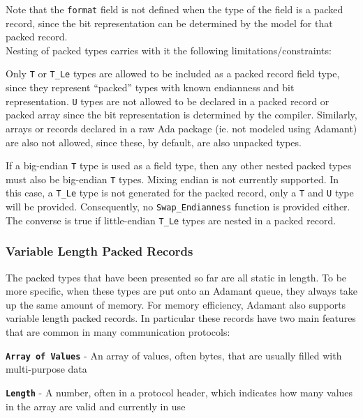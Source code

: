 
Note that the \texttt{format} field is not defined when the type of the field is a packed record, since the bit representation can be determined by the model for that packed record. \\

Nesting of packed types carries with it the following limitations/constraints:

\vspace{5mm} %
\begin{spacedenumerate}
  \item Only \texttt{T} or \texttt{T\_Le} types are allowed to be included as a packed record field type, since they represent ``packed'' types with known endianness and bit representation. \texttt{U} types are not allowed to be declared in a packed record or packed array since the bit representation is determined by the compiler. Similarly, arrays or records declared in a raw Ada package (ie. not modeled using Adamant) are also not allowed, since these, by default, are also unpacked types.
  \item If a big-endian \texttt{T} type is used as a field type, then any other nested packed types must also be big-endian \texttt{T} types. Mixing endian is not currently supported. In this case, a \texttt{T\_Le} type is not generated for the packed record, only a \texttt{T} and \texttt{U} type will be provided. Consequently, no \texttt{Swap\_Endianness} function is provided either. The converse is true if little-endian \texttt{T\_Le} types are nested in a packed record.
\end{spacedenumerate}
\vspace{5mm} %

\subsubsection{Variable Length Packed Records} \label{Variable Length Packed Records}

The packed types that have been presented so far are all static in length. To be more specific, when these types are put onto an Adamant queue, they always take up the same amount of memory. For memory efficiency, Adamant also supports variable length packed records. In particular these records have two main features that are common in many communication protocols:

\vspace{5mm} %
\begin{spaceditemize}
  \item \textbf{\texttt{Array of Values}} - An array of values, often bytes, that are usually filled with multi-purpose data
  \item \textbf{\texttt{Length}} - A number, often in a protocol header, which indicates how many values in the array are valid and currently in use
\end{spaceditemize}
\vspace{5mm} %

